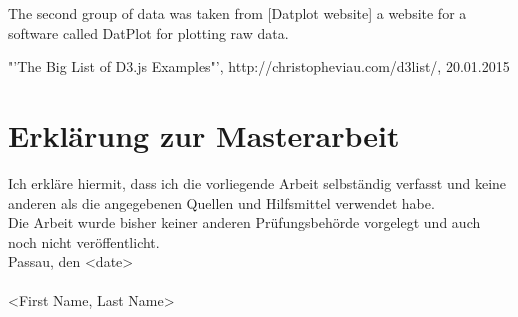 \documentclass[12pt, a4paper,oneside]{report}
\begin{document}
The second group of data was taken from [Datplot website] a website for a software called DatPlot for plotting raw data.












\begin{thebibliography}{12345678}
 "'The Big List of D3.js Examples"', http://christopheviau.com/d3list/, 20.01.2015






\end{thebibliography}

\newpage
\chapter*{Erklärung zur Masterarbeit}
Ich erkläre hiermit, dass ich die vorliegende Arbeit selbständig verfasst und keine anderen als die angegebenen Quellen und Hilfsmittel verwendet habe. \newline
\ \\
Die Arbeit wurde bisher keiner anderen Prüfungsbehörde vorgelegt und auch noch nicht veröffentlicht.\newline
\ \\
Passau, den <date>
\newline
\ \\
\ \\
<First Name, Last Name>
\end{document}
